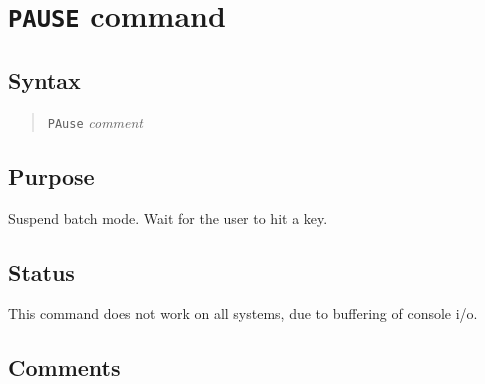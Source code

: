 %
%
%
%
\section{{\tt PAUSE} command}
\subsection{Syntax}
\begin{verse}
{\tt PAuse} {\it comment}
\end{verse}
\subsection{Purpose}

Suspend batch mode.  Wait for the user to hit a key.
\subsection{Status}

This command does not work on all systems, due to buffering of console i/o.
\subsection{Comments}

